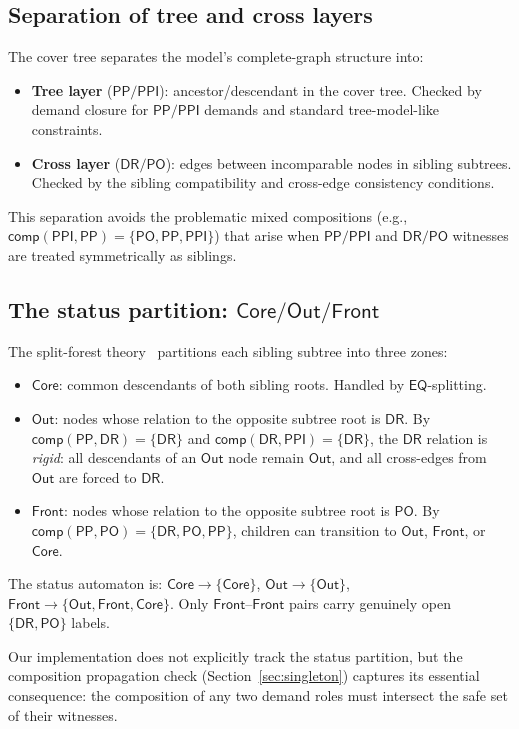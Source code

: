 \documentclass[a4paper,11pt]{article}
\theoremstyle{definition}
\newcommand{\DR}{\ensuremath{\mathsf{DR}}}
\newcommand{\PO}{\ensuremath{\mathsf{PO}}}
\newcommand{\EQ}{\ensuremath{\mathsf{EQ}}}
\newcommand{\PP}{\ensuremath{\mathsf{PP}}}
\newcommand{\PPI}{\ensuremath{\mathsf{PPI}}}
\newcommand{\comp}{\ensuremath{\mathsf{comp}}}
\newcommand{\Core}{\ensuremath{\mathsf{Core}}}
\newcommand{\Out}{\ensuremath{\mathsf{Out}}}
\newcommand{\Front}{\ensuremath{\mathsf{Front}}}
\begin{document}
\subsection{Separation of tree and cross layers}

The cover tree separates the model's complete-graph structure into:
\begin{itemize}[nosep]
  \item \textbf{Tree layer} ($\PP/\PPI$): ancestor/descendant in
    the cover tree.  Checked by demand closure for $\PP/\PPI$
    demands and standard tree-model-like constraints.
  \item \textbf{Cross layer} ($\DR/\PO$): edges between
    incomparable nodes in sibling subtrees.  Checked by the
    sibling compatibility and cross-edge consistency conditions.
\end{itemize}
This separation avoids the problematic mixed compositions
(e.g., $\comp(\PPI, \PP) = \{\PO, \PP, \PPI\}$) that arise
when $\PP/\PPI$ and $\DR/\PO$ witnesses are treated symmetrically
as siblings.

\subsection{The status partition: $\Core/\Out/\Front$}

The split-forest theory~\cite{SiblingCompleted} partitions each
sibling subtree into three zones:
\begin{itemize}[nosep]
  \item $\Core$: common descendants of both sibling roots.
    Handled by $\EQ$-splitting.
  \item $\Out$: nodes whose relation to the opposite subtree root
    is $\DR$.  By $\comp(\PP,\DR) = \{\DR\}$ and
    $\comp(\DR,\PPI) = \{\DR\}$, the $\DR$ relation is
    \emph{rigid}: all descendants of an $\Out$ node remain $\Out$,
    and all cross-edges from $\Out$ are forced to $\DR$.
  \item $\Front$: nodes whose relation to the opposite subtree
    root is $\PO$.  By $\comp(\PP,\PO) = \{\DR,\PO,\PP\}$,
    children can transition to $\Out$, $\Front$, or $\Core$.
\end{itemize}
The status automaton is:
$\Core \to \{\Core\}$, $\Out \to \{\Out\}$,
$\Front \to \{\Out, \Front, \Core\}$.
Only $\Front$--$\Front$ pairs carry genuinely open $\{\DR,\PO\}$
labels.

Our implementation does not explicitly track the status partition,
but the composition propagation check (Section~\ref{sec:singleton})
captures its essential consequence: the composition of any two
demand roles must intersect the safe set of their witnesses.
\end{document}
